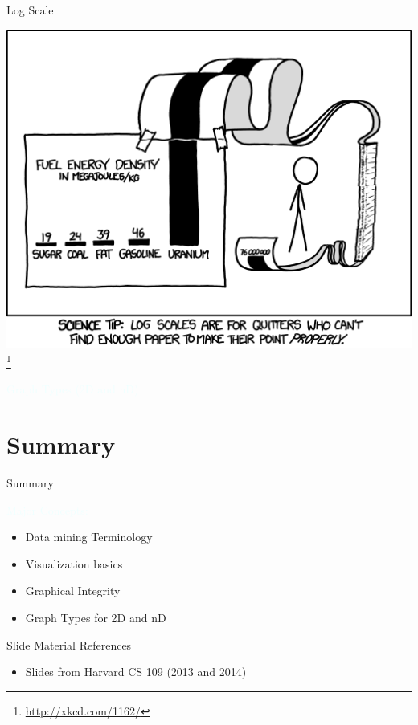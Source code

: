 \documentclass{beamer}
\newcommand{\tblue}[1]{{\Large {\textcolor{azure}{#1}}}}
\newcommand{\thblue}[1]{{\Huge {\textcolor{azure}{#1}}}}
\newcommand{\furl}[1]{{\footnote{\url{#1}}}}
\begin{document}
\begin{frame}{Log Scale}
    \begin{center}
        \includegraphics[scale=0.38]{xkcdLogScale.png}\furl{http://xkcd.com/1162/}
    \end{center} 
\end{frame}


\begin{frame}{} 
    \begin{center}
        \thblue{Graph Types (2D and nD)} \\
    \end{center}
\end{frame}




\section{Summary}

\begin{frame}{Summary}

\tblue{Major Concepts:}
\begin{itemize}
    \item Data mining Terminology
    \item Visualization basics
    \item Graphical Integrity
    \item Graph Types for 2D and nD
\end{itemize}
\end{frame}

\begin{frame}{Slide Material References}

\begin{itemize}
    \item Slides from Harvard CS 109 (2013 and 2014)
\end{itemize}
\end{frame}
\end{document}
